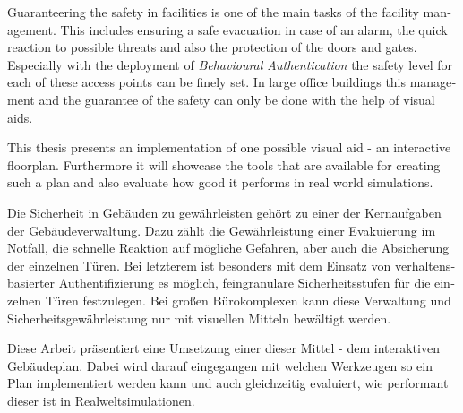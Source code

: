 
\null\vfil
\begin{otherlanguage}{english}
\begin{center}\textsf{\textbf{\abstractname}}\end{center}

\noindent Guaranteering the safety in facilities is one of the main tasks of the facility management. This includes ensuring a safe evacuation in case of an alarm, the quick reaction to possible threats and also the protection of the doors and gates. Especially with the deployment of \emph{Behavioural Authentication} the safety level for each of these access points can be finely set. In large office buildings this management and the guarantee of the safety can only be done with the help of visual aids.

This thesis presents an implementation of one possible visual aid - an interactive floorplan. Furthermore it will showcase the tools that are available for creating such a plan and also evaluate how good it performs in real world simulations.

\end{otherlanguage}
\vfil\null



\null\vfil
\begin{otherlanguage}{ngerman}
\begin{center}\textsf{\textbf{\abstractname}}\end{center}

\noindent Die Sicherheit in Gebäuden zu gewährleisten gehört zu einer der Kernaufgaben der Gebäudeverwaltung. Dazu zählt die Gewährleistung einer Evakuierung im Notfall, die schnelle Reaktion auf mögliche Gefahren, aber auch die Absicherung der einzelnen Türen. Bei letzterem ist besonders mit dem Einsatz von verhaltensbasierter Authentifizierung es möglich, feingranulare Sicherheitsstufen für die einzelnen Türen festzulegen. Bei großen Bürokomplexen kann diese Verwaltung und Sicherheitsgewährleistung nur mit visuellen Mitteln bewältigt werden. 

Diese Arbeit präsentiert eine Umsetzung einer dieser Mittel - dem interaktiven Gebäudeplan. Dabei wird darauf eingegangen mit welchen Werkzeugen so ein Plan implementiert werden kann und auch gleichzeitig evaluiert, wie performant dieser ist in  Realweltsimulationen.

\end{otherlanguage}
\vfil\null



